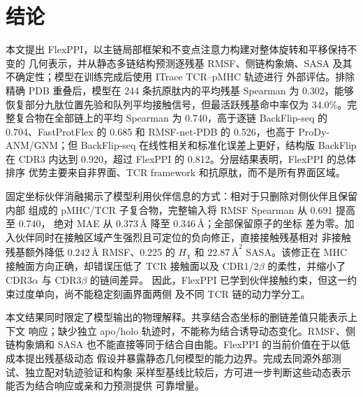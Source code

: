 
\section{结论}

本文提出 FlexPPI，以主链局部框架和不变点注意力构建对整体旋转和平移保持不变的
几何表示，并从静态多链结构预测逐残基 RMSF、侧链构象熵、SASA 及其不确定性；模型在训练完成后使用 ITrace TCR--pMHC 轨迹进行
外部评估。排除精确 PDB 重叠后，模型在 244 条抗原肽内的平均残基 Spearman 为
0.302，能够恢复部分九肽位置先验和队列平均接触信号，但最活跃残基命中率仅为
34.0\%。完整复合物在全部链上的平均 Spearman 为 0.740，高于逐链 BackFlip-seq
的 0.704、FastProtFlex 的 0.685 和 RMSF-net-PDB 的 0.526，也高于
ProDy-ANM/GNM；但 BackFlip-seq 在线性相关和标准化误差上更好，结构版 BackFlip
在 CDR3 内达到 0.920，超过 FlexPPI 的 0.812。分层结果表明，FlexPPI 的总体排序
优势主要来自非界面、TCR framework 和抗原肽，而不是所有界面区域。

固定坐标伙伴消融揭示了模型利用伙伴信息的方式：相对于只删除对侧伙伴且保留内部
组成的 pMHC/TCR 子复合物，完整输入将 RMSF Spearman 从 0.691 提高至 0.740，
绝对 MAE 从 $0.373\,\text{\AA}$ 降至 $0.346\,\text{\AA}$；全部保留原子的坐标
差为零。加入伙伴同时在接触区域产生强烈且可定位的负向修正，直接接触残基相对
非接触残基额外降低 $0.242\,\text{\AA}$ RMSF、0.225 的 $H_\chi$ 和
$22.87\,\text{\AA}^2$ SASA。该修正在 MHC 接触面方向正确，却错误压低了 TCR 接触面以及
CDR1/2$\beta$ 的柔性，并缩小了 CDR3$\alpha$ 与 CDR3$\beta$ 的链间差异。
因此，FlexPPI 已学到伙伴接触约束，但这一约束过度单向，尚不能稳定刻画界面两侧
及不同 TCR 链的动力学分工。

本文结果同时限定了模型输出的物理解释。共享结合态坐标的删链差值只能表示上下文
响应；缺少独立 apo/holo 轨迹时，不能称为结合诱导动态变化。RMSF、侧链构象熵和
SASA 也不能直接等同于结合自由能。FlexPPI 的当前价值在于以低成本提出残基级动态
假设并暴露静态几何模型的能力边界。完成去同源外部测试、独立配对轨迹验证和构象
采样型基线比较后，方可进一步判断这些动态表示能否为结合响应或亲和力预测提供
可靠增量。
